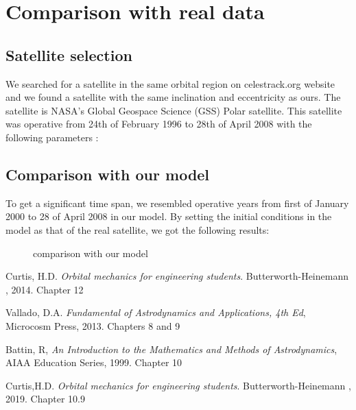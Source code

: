 \documentclass[11pt,a4paper]{report}
\begin{document}
\section{Comparison with real data}

\subsection{Satellite selection}
We searched for a satellite in the same orbital region on celestrack.org website and we found a satellite with the same inclination and eccentricity as ours. 
The satellite is NASA’s Global Geospace Science (GSS) Polar satellite.
This satellite was operative from 24th of February 1996 to 28th of April 2008 with the following parameters :

\begin{table}[H]
\centering
{}
\end{table}
\subsection{Comparison with our model}

To get a significant time span, we resembled operative years from first of January 2000 to 28 of April 2008 in our model.
By setting the initial conditions in the model as that of the real satellite, we got the following results: 

\begin{figure}[H]
\centering
{}
\caption{comparison with our model}
\end{figure}

\begin{thebibliography}{9}
Curtis, H.D. 
\textit{Orbital mechanics for engineering students}. 
Butterworth-Heinemann , 2014. Chapter 12

Vallado, D.A.
\textit{Fundamental of Astrodynamics and Applications, 4th
Ed}, Microcosm Press, 2013. Chapters 8 and 9

Battin, R,
\textit{An Introduction to the Mathematics and Methods of
Astrodynamics}, AIAA Education Series, 1999. Chapter 10

Curtis,H.D. 
\textit{Orbital mechanics for engineering students}. 
Butterworth-Heinemann , 2019. Chapter 10.9

\end{thebibliography}
\end{document}
